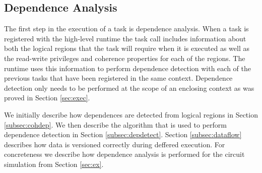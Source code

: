 \subsection{Dependence Analysis} 
\label{subsec:depanalysis}
The first step in the execution of a task is dependence analysis.  When
a task is registered with the high-level runtime the task call includes
information about both the logical regions that the task will require
when it is executed as well as the read-write privileges and coherence properties
for each of the regions.  The runtime uses this information to perform
dependence detection with each of the previous tasks that have been registered
in the same context.  Dependence detection only needs to be performed at
the scope of an enclosing context as was proved in Section \ref{sec:exec}. 

We initially describe how dependences are detected from logical regions
in Section \ref{subsec:cohdep}.  We then describe the algorithm that
is used to perform dependence detection in Section \ref{subsec:depdetect}.
Section \ref{subsec:dataflow} describes how data is versioned correctly
during deffered execution.  For concreteness we describe how dependence
analysis is performed for the circuit simulation from Section \ref{sec:ex}.
